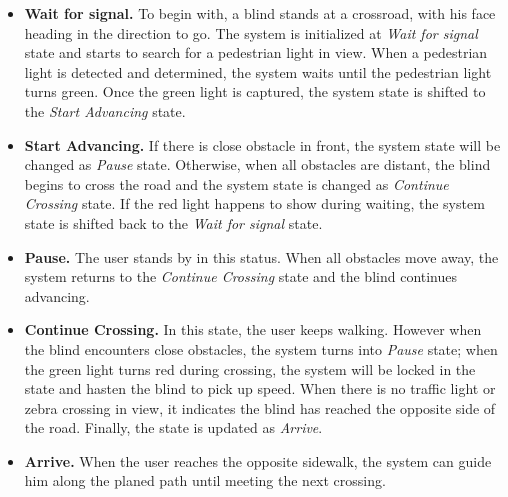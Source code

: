 \begin{itemize}
\item \textbf{Wait for signal.} To begin with, a blind stands at a crossroad, with his face heading in the direction to go. The system is initialized at \emph{Wait for signal} state and starts to search for a pedestrian light in view. When a pedestrian light is detected and determined, the system waits until the pedestrian light turns green. Once the green light is captured, the system state is shifted to the \emph{Start Advancing} state.

\item \textbf{Start Advancing.} 
If there is close obstacle in front, the system state will be changed as \emph{Pause} state. Otherwise, when all obstacles are distant, the blind begins to cross the road and the system state is changed as \emph{Continue Crossing} state. If the red light happens to show during waiting, the system state is shifted back to the \emph{Wait for signal} state. 


\item \textbf{Pause.} The user stands by in this status. When all obstacles move away, the system returns to the \emph{Continue Crossing} state and the blind continues advancing. 


\item \textbf{Continue Crossing.} In this state, the user keeps walking. However when the blind encounters close obstacles, the system turns into \emph{Pause} state; when  the green light turns red during crossing, the system will be locked in the state and hasten the blind to pick up speed. When there is no traffic light or zebra crossing in view, it indicates the blind has reached the opposite side of the road. Finally, the state is updated as \emph{Arrive}.


\item \textbf{Arrive.} When the user reaches the opposite sidewalk, the system can guide him along the planed path until meeting the next crossing. 
\end{itemize}



